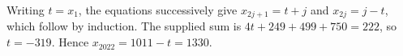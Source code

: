Writing $t=x_1$, the equations successively give $x_{2j+1}=t+j$ and $x_{2j}=j-t$, which follow by induction. The supplied sum is $4t+249+499+750=222$, so $t=-319$. Hence $x_{2022}=1011-t=\boxed{1330}$.
